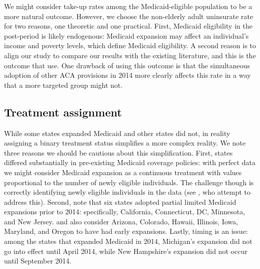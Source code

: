 \documentclass[12pt]{article}
\begin{document}
We might consider take-up rates among the Medicaid-eligible population to be a more natural outcome. However, we choose the non-elderly adult uninsurate rate for two reasons, one theoretic and one practical. First, Medicaid eligibility in the post-period is likely endogenous: Medicaid expansion may affect an individual's income and poverty levels, which define Medicaid eligibility. A second reason is to align our study to compare our results with the existing literature, and this is the outcome that \cite{courtemanche2017early} use. One drawback of using this outcome is that the simultaneous adoption of other ACA provisions in 2014 more clearly affects this rate in a way that a more targeted group might not.

\subsection{Treatment assignment}

While some states expanded Medicaid and other states did not, in reality assigning a binary treatment status simplifies a more complex reality. We note three reasons we should be cautious about this simplification. First, states differed substantially in pre-existing Medicaid coverage policies: with perfect data we might consider Medicaid expansion as a continuous treatment with values proportional to the number of newly eligible individuals. The challenge though is correctly identifying newly eligible individuals in the data (see \cite{frean2017premium}, who attempt to address this). Second, \cite{frean2017premium} note that six states adopted partial limited Medicaid expansions prior to 2014: specifically, California, Connecticut, DC, Minnesota, and New Jersey. \cite{kaestner2017effects} and \cite{courtemanche2017early} also consider Arizona, Colorado, Hawaii, Illinois, Iowa, Maryland, and Oregon to have had early expansions. Lastly, timing is an issue: among the states that expanded Medicaid in 2014, Michigan's expansion did not go into effect until April 2014, while New Hampshire's expansion did not occur until September 2014.
\end{document}

